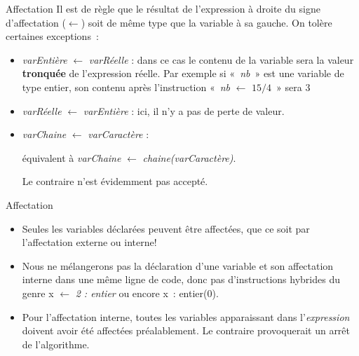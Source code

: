 \begin{frame}{Affectation}
	Il est de règle que le résultat de l’expression à droite du signe
	d’affectation ($\gets$) soit de
	même type que la variable à sa gauche. On tolère certaines exceptions~:
	\begin{itemize}
	\item
		\textit{varEntière}{ $\gets$ }\textit{varRéelle} : 
		dans ce cas le contenu de la variable sera la valeur \textbf{tronquée}
		de l’expression réelle. 
		Par exemple si «~\textit{nb}~» est
		une variable de type entier, son contenu après l’instruction
		«~\textit{nb}{ $\gets$ }\textit{$15/4$}~» 
		sera 3
	\item 
		\textit{varRéelle}{ $\gets$ }\textit{varEntière} :
		ici, il n'y a pas de perte de valeur.
	\item 
		\textit{varChaine}{ $\gets$ }\textit{varCaractère} : 
		
		équivalent à \textit{varChaine}{ $\gets$ }\textit{chaine(varCaractère)}.
		
		Le contraire n'est évidemment pas accepté.
	\end{itemize}
\end{frame}

\begin{frame}{Affectation}
	\begin{itemize}
	\item 
		Seules les variables déclarées peuvent être affectées, que ce soit par
		l’affectation externe ou interne!
	\item 
		Nous ne mélangerons pas la déclaration d’une variable et son
		affectation interne dans une même ligne de code, donc pas
		d’instructions hybrides du genre 
		\textsf{x}{ $\gets$ }\textit{2 : entier} ou encore 
		\textsf{x~: entier(0)}.
	\item 
		Pour l’affectation interne, toutes les variables apparaissant dans
		l'\textit{expression} doivent avoir été affectées
		préalablement. Le contraire provoquerait un arrêt de l’algorithme.
	\end{itemize}
	
\end{frame}

